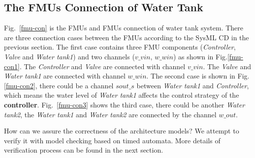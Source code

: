 \subsection{The FMUs  Connection of Water Tank}
Fig.~\ref{fmu-con} is the FMUs and FMUs connection of water tank system. There are three connection cases between the FMUs according to the SysML CD in the previous section. The first case contains three FMU components (\emph{Controller}, \emph{Valve} and \emph{Water tank1}) and two channels ($v \_ vin$, $w \_ win$) as shown in Fig.\ref{fmu-con1}. The \emph{Controller} and \emph{Valve} are connected with channel $v \_ vin$. The \emph{Valve} and \emph{Water tank1} are connected with channel $w \_ win$. The second case is shown in Fig.\ref{fmu-con2}, there could be a channel $sout \_ s$ between \emph{Water tank1} and \emph{Controller}, which means the water level of \emph{Water tank1} affects the control strategy of the \textbf{controller}. Fig.~\ref{fmu-con3} shows the third case, there could be another \emph{Water tank2}, the \emph{Water tank1} and \emph{Water tank2} are connected by the channel $w \_ out$. 
\begin{figure}[htbp]
\end{figure}
How can we assure the correctness of the architecture models? We attempt to verify it with model checking based on timed automata. More details of verification process can be found in the next section.